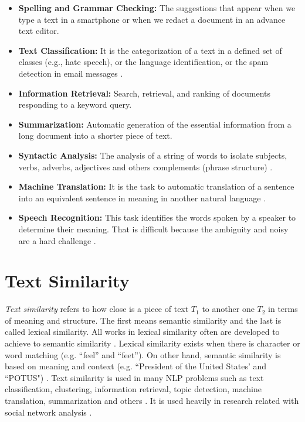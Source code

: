 \documentclass[12pt]{report}
\begin{document}
\begin{itemize}[nolistsep]
	\item \textbf{Spelling and Grammar Checking:} The suggestions that appear when we type a text in a smartphone or when we redact a document in an advance text editor. 
	
	\item \textbf{Text Classification:} It is the categorization of a text in a defined set of classes (e.g., hate speech), or the language identification, or the  spam detection in email messages \cite{Russell2010}.
	
	\item \textbf{Information Retrieval:} Search, retrieval, and ranking  of documents responding to a keyword query.
	
	\item \textbf{Summarization:} Automatic generation of  the essential information from a long document into a shorter piece of text.
	
	\item \textbf{Syntactic Analysis:} The analysis of a string of words to isolate subjects, verbs, adverbs, adjectives and others complements (phrase structure) \cite{Russell2010}.
	
	\item \textbf{Machine Translation:} It is the task to automatic translation of a sentence into an equivalent sentence in meaning in another natural language \cite{Goodfellow2016}.
	
	\item \textbf{Speech Recognition:} This task identifies the words spoken by a speaker to determine their meaning. That is difficult because the ambiguity and noisy are a hard challenge \cite{Russell2010}.
	
\end{itemize}

\section{Text Similarity}
{\em Text similarity} refers to how close is a piece of text $T_1$ to another one $T_2$ in terms of meaning and structure.  The first means semantic similarity and the last is called lexical similarity. All works in lexical similarity often are developed to achieve to semantic similarity \cite{Ganesan2015}.  Lexical similarity exists when there is character or word matching (e.g. ``feel'' and ``feet''). On other hand, semantic similarity is based on meaning and context (e.g. ``President of the United States' and ``POTUS") \cite{Pradhan2015}. 
Text similarity is used in many \ac{NLP} problems such as text classification, clustering, information retrieval, topic detection, machine translation, summarization and others \cite{Majumder2016} \cite{Gomaa2013} \cite{Pradhan2015}. It is used heavily in research related with social network analysis \cite{Zhang2015}.  
\end{document}
